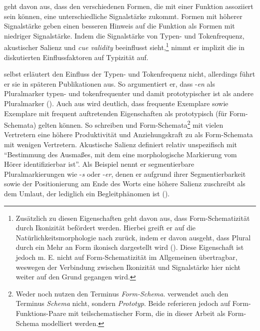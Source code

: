 \textcite[82--83]{Kopcke.1993} geht davon aus, dass den verschiedenen Formen, die mit einer Funktion assoziiert sein können, eine unterschiedliche Signalstärke zukommt. Formen mit höherer Signalstärke geben einen besseren Hinweis auf die Funktion als Formen mit niedriger Signalstärke. Indem \textcite[82--83]{Kopcke.1993} die Signalstärke von Typen- und Tokenfrequenz, akustischer Salienz und \textit{cue validity} beeinflusst sieht,\footnote{Zusätzlich zu diesen Eigenschaften geht \textcite[83]{Kopcke.1993} davon aus, dass Form-Schematizität durch Ikonizität befördert werden. Hierbei greift er auf die Natürlichkeitsmorphologie nach \textcite{Wurzel.1984} zurück, indem er davon ausgeht, dass Plural durch ein Mehr an Form ikonisch dargestellt wird (\cite[83]{Kopcke.1993}). Diese Eigenschaft ist jedoch m. E. nicht auf Form-Schematizität im Allgemeinen übertragbar, weswegen der Verbindung zwischen Ikonizität und Signalstärke hier nicht weiter auf den Grund gegangen wird.} nimmt er implizit die in  diskutierten Einflussfaktoren auf Typizität auf.   



\textcite[82]{Kopcke.1993} selbst erläutert den Einfluss der Typen- und Tokenfrequenz nicht, allerdings führt er sie in späteren Publikationen aus. So argumentiert er, dass -\textit{en} als Pluralmarker typen- und tokenfrequenter  und damit prototypischer ist als andere Pluralmarker (\cite[83]{Kopcke.2017}). Auch aus  wird deutlich, dass frequente Exemplare sowie Exemplare mit frequent auftretenden Eigenschaften als prototypisch (für Form-Schemata) gelten können. So schreiben \textcite[67]{Bybee.2010} und \textcite[75]{Poitou.2004} Form-Schemata\footnote{Weder \textcite{Bybee.2010} noch \textcite{Poitou.2004} nutzen den Terminus \textit{Form-Schema}. \textcite{Poitou.2004} verwendet auch den Terminus \textit{Schema} nicht, sondern \textit{Prototyp}. Beide referieren jedoch auf Form-Funktions-Paare mit teilschematischer Form, die in dieser Arbeit als Form-Schema modelliert werden.} mit vielen Vertretern eine höhere Produktivität und Anziehungskraft zu als Form-Schemata mit wenigen Vertretern. Akustische Salienz definiert \textcite[82]{Kopcke.1993} relativ unspezifisch mit "`Bestimmung des Ausmaßes, mit dem eine morphologische Markierung vom Hörer identifizierbar ist"'. Als Beispiel nennt er segmentierbare Pluralmarkierungen wie -\textit{s} oder -\textit{er}, denen er aufgrund ihrer Segmentierbarkeit sowie der Positionierung am Ende des Worts eine höhere Salienz zuschreibt als dem Umlaut, der lediglich ein Begleitphänomen ist (\cite[82]{Kopcke.1993}).  

